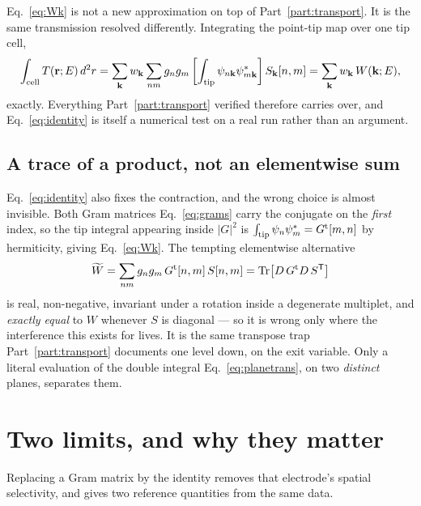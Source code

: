 \documentclass[11pt]{article}
\begin{document}
Eq.~\eqref{eq:Wk} is not a new approximation on top of
Part~\ref{part:transport}. It is the same transmission resolved differently.
Integrating the point-tip map over one tip cell,
\begin{equation}
  \int_{\rm cell} T(\mathbf r;E)\,d^2r
  = \sum_{\mathbf k}w_{\mathbf k}\sum_{nm} g_n g_m
    \left[\int_{\rm tip}\psi_{n\mathbf k}\psi^*_{m\mathbf k}\right]
    S_{\mathbf k}[n,m]
  = \sum_{\mathbf k}w_{\mathbf k}\,W(\mathbf k;E),
  \label{eq:identity}
\end{equation}
exactly. Everything Part~\ref{part:transport} verified therefore carries over,
and Eq.~\eqref{eq:identity} is itself a numerical test on a real run rather
than an argument.

\subsection{A trace of a product, not an elementwise sum}

Eq.~\eqref{eq:identity} also fixes the contraction, and the wrong choice is
almost invisible. Both Gram matrices Eq.~\eqref{eq:grams} carry the conjugate
on the \emph{first} index, so the tip integral appearing inside $|G|^2$ is
$\int_{\rm tip}\psi_n\psi^*_m = G^{\rm t}[m,n]$ by hermiticity, giving
Eq.~\eqref{eq:Wk}. The tempting elementwise alternative
\begin{equation}
  \widetilde W = \sum_{nm} g_n g_m\,G^{\rm t}[n,m]\,S[n,m]
  = \mathrm{Tr}\big[D\,G^{\rm t}D\,S^{\mathsf T}\big]
  \label{eq:wrongform}
\end{equation}
is real, non-negative, invariant under a rotation inside a degenerate
multiplet, and \emph{exactly equal} to $W$ whenever $S$ is diagonal --- so it
is wrong only where the interference this exists for lives. It is the same
transpose trap Part~\ref{part:transport} documents one level down, on the exit
variable. Only a literal evaluation of the double integral
Eq.~\eqref{eq:planetrans}, on two \emph{distinct} planes, separates them.

\section{Two limits, and why they matter}

Replacing a Gram matrix by the identity removes that electrode's spatial
selectivity, and gives two reference quantities from the same data.
\end{document}

